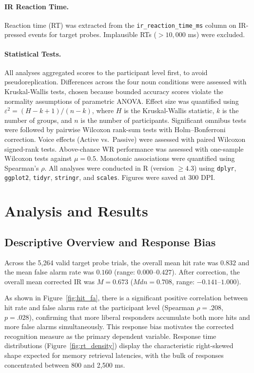 \documentclass[12pt, a4paper]{article}
\begin{document}
\paragraph{IR Reaction Time.}
Reaction time (RT) was extracted from the \texttt{ir\_reaction\_time\_ms} column
on IR-pressed events for target probes. Implausible RTs ($> 10{,}000$ ms) were
excluded.

\paragraph{Statistical Tests.}
All analyses aggregated scores to the participant level first, to avoid
pseudoreplication. Differences across the four noun conditions were assessed
with Kruskal-Wallis tests, chosen because bounded accuracy scores violate the
normality assumptions of parametric ANOVA. Effect size was quantified using
$\varepsilon^2 = (H - k + 1)/(n - k)$, where $H$ is the Kruskal-Wallis
statistic, $k$ is the number of groups, and $n$ is the number of participants.
Significant omnibus tests were followed by pairwise Wilcoxon rank-sum tests
with Holm--Bonferroni correction. Voice effects (Active vs.\ Passive) were
assessed with paired Wilcoxon signed-rank tests. Above-chance WR performance
was assessed with one-sample Wilcoxon tests against $\mu = 0.5$. Monotonic
associations were quantified using Spearman's $\rho$. All analyses were
conducted in R (version $\geq 4.3$) using \texttt{dplyr}, \texttt{ggplot2},
\texttt{tidyr}, \texttt{stringr}, and \texttt{scales}. Figures were saved
at 300 DPI.


\section{Analysis and Results}

\subsection{Descriptive Overview and Response Bias}

Across the 5,264 valid target probe trials, the overall mean hit rate was $0.832$
and the mean false alarm rate was $0.160$ (range: $0.000$--$0.427$). After
correction, the overall mean corrected IR was $M = 0.673$ ($Mdn = 0.708$,
range: $-0.141$--$1.000$).

As shown in Figure~\ref{fig:hit_fa}, there is a significant positive correlation
between hit rate and false alarm rate at the participant level (Spearman
$\rho = .208$, $p = .028$), confirming that more liberal responders accumulate
both more hits and more false alarms simultaneously. This response bias motivates
the corrected recognition measure as the primary dependent variable. Response
time distributions (Figure~\ref{fig:rt_density}) display the characteristic
right-skewed shape expected for memory retrieval latencies, with the bulk of
responses concentrated between 800 and 2,500 ms.
\end{document}
